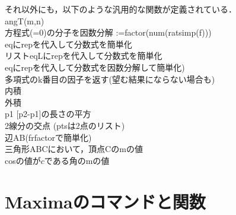 \documentclass[a4j,12pt]{jarticle}
\begin{document}
\noindent
それ以外にも，以下のような汎用的な関数が定義されている．\vspace{2mm}\\
\hspace*{2zw}angT(m,n)\\
\hspace*{2zw}方程式(=0)の分子を因数分解 :=factor(num(ratsimp(f)))\\
\hspace*{2zw}eqにrepを代入して分数式を簡単化\\
\hspace*{2zw}リストeqLにrepを代入して分数式を簡単化\\
\hspace*{2zw}eqにrepを代入して分数式を因数分解して簡単化)\\
\hspace*{2zw}多項式のk番目の因子を返す(望む結果にならない場合も)\\
\hspace*{2zw}内積\\
\hspace*{2zw}外積\\
\hspace*{2zw}p1 [p2-p1]の長さの平方\\
\hspace*{2zw}2線分の交点 (ptsは2点のリスト)\\
\hspace*{2zw}辺AB(frfactorで簡単化)\\
\hspace*{2zw}三角形ABCにおいて，頂点Cのmの値\\
\hspace*{2zw}cosの値が$c$である角のmの値

\section{Maximaのコマンドと関数}
\end{document}
